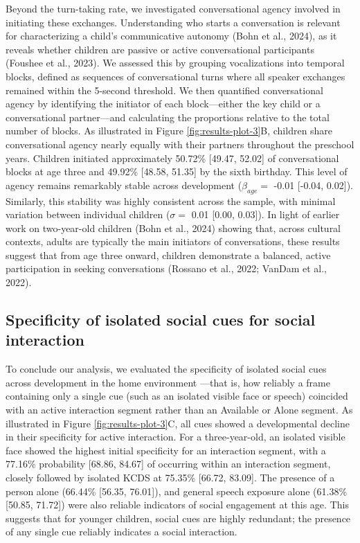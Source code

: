 \documentclass[
  english,
  12pt,
  man,floatsintext]{apa6}
\begin{document}
Beyond the turn-taking rate, we investigated conversational agency involved in initiating these exchanges. Understanding who starts a conversation is relevant for characterizing a child's communicative autonomy (Bohn et al., 2024), as it reveals whether children are passive or active conversational participants (Foushee et al., 2023). We assessed this by grouping vocalizations into temporal blocks, defined as sequences of conversational turns where all speaker exchanges remained within the 5-second threshold. We then quantified conversational agency by identifying the initiator of each block---either the key child or a conversational partner---and calculating the proportions relative to the total number of blocks. As illustrated in Figure \ref{fig:results-plot-3}B, children share conversational agency nearly equally with their partners throughout the preschool years. Children initiated approximately 50.72\% {[}49.47, 52.02{]} of conversational blocks at age three and 49.92\% {[}48.58, 51.35{]} by the sixth birthday. This level of agency remains remarkably stable across development (\(\beta_{age} =\) -0.01 {[}-0.04, 0.02{]}). Similarly, this stability was highly consistent across the sample, with minimal variation between individual children (\(\sigma =\) 0.01 {[}0.00, 0.03{]}). In light of earlier work on two-year-old children (Bohn et al., 2024) showing that, across cultural contexts, adults are typically the main initiators of conversations, these results suggest that from age three onward, children demonstrate a balanced, active participation in seeking conversations (Rossano et al., 2022; VanDam et al., 2022).

\subsection{Specificity of isolated social cues for social interaction}\label{specificity-of-isolated-social-cues-for-social-interaction}

To conclude our analysis, we evaluated the specificity of isolated social cues across development in the home environment ---that is, how reliably a frame containing only a single cue (such as an isolated visible face or speech) coincided with an active interaction segment rather than an Available or Alone segment. As illustrated in Figure \ref{fig:results-plot-3}C, all cues showed a developmental decline in their specificity for active interaction. For a three-year-old, an isolated visible face showed the highest initial specificity for an interaction segment, with a 77.16\% probability {[}68.86, 84.67{]} of occurring within an interaction segment, closely followed by isolated KCDS at 75.35\% {[}66.72, 83.09{]}. The presence of a person alone (66.44\% {[}56.35, 76.01{]}), and general speech exposure alone (61.38\% {[}50.85, 71.72{]}) were also reliable indicators of social engagement at this age. This suggests that for younger children, social cues are highly redundant; the presence of any single cue reliably indicates a social interaction.
\end{document}
